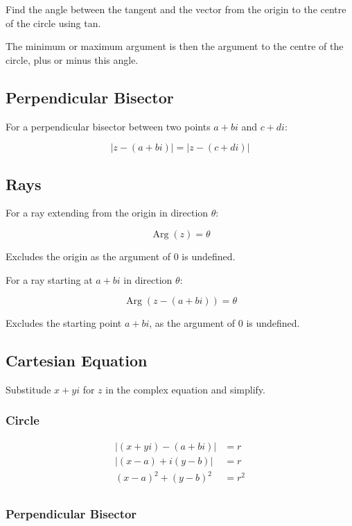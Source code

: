 \documentclass[a4paper,11pt]{article}
\DeclareMathOperator\Arg{Arg}
\begin{document}
Find the angle between the tangent and the vector from the origin to the centre
of the circle using tan.

The minimum or maximum argument is then the argument to the centre of the
circle, plus or minus this angle.


\subsection{Perpendicular Bisector}

For a perpendicular bisector between two points $a + bi$ and $c + di$:

$$
\lvert z - (a + bi) \rvert = \lvert z - (c + di) \rvert
$$


\subsection{Rays}

For a ray extending from the origin in direction $\theta$:

$$
\Arg(z) = \theta
$$

Excludes the origin as the argument of 0 is undefined.

For a ray starting at $a + bi$ in direction $\theta$:

$$
\Arg(z - (a + bi)) = \theta
$$

Excludes the starting point $a + bi$, as the argument of 0 is undefined.


\subsection{Cartesian Equation}

Substitude $x + yi$ for $z$ in the complex equation and simplify.

\subsubsection{Circle}

$$
\begin{aligned}
\lvert (x + yi) - (a + bi) \rvert & = r \\
\lvert (x - a) + i(y - b) \rvert & = r \\
(x - a)^2 + (y - b)^2 & = r^2 \\
\end{aligned}
$$


\subsubsection{Perpendicular Bisector}
\end{document}
